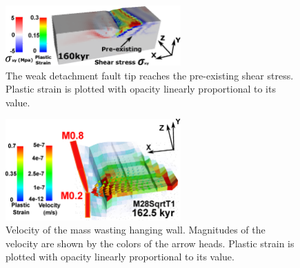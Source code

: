 \begin{figure}[h]
  \centering
    \includegraphics[width=0.6\textwidth]{./Figures/fig_Results4_5_sqrt_cut_back_pre_accummulated_shear_zone.eps}
  \caption{The weak detachment fault tip reaches the pre-existing shear stress. Plastic strain is plotted with opacity linearly proportional to its value.}
 \label{fig_Results4_5}
\end{figure}   

\begin{figure}[h]
  \centering
    \includegraphics[width=0.6\textwidth]{./Figures/fig_Results_3_2_5_Cut-back_velocity.eps}
  \caption{Velocity of the mass wasting hanging wall. Magnitudes of the velocity are shown by the colors of the arrow heads. Plastic strain is plotted with opacity linearly proportional to its value.}
 \label{fig_Results_3_2_5_Cut-back_velocity}
\end{figure}   

